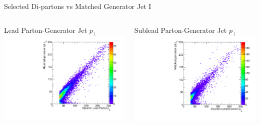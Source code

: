 \documentclass[8pt]{beamer}
\begin{document}
\begin{frame}{Selected Di-partons vs Matched Generator Jet I}

\begin{columns}

  \centering

  \begin{block}{Lead Parton-Generator Jet $p_\perp$}
    \centering
    \includegraphics[width=0.8\linewidth]{img/SelDiParton_MatchedGenJet_Parton1_Pt.pdf}
    
  \end{block}
  
  \centering
 
  \begin{block}{Sublead Parton-Generator Jet $p_\perp$}
    \centering
    \includegraphics[width=0.8\linewidth]{img/SelDiParton_MatchedGenJet_Parton2_Pt.pdf}
  \end{block}

\end{columns}


\end{frame}
\end{document}
